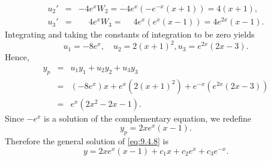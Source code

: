 \begin{examplesolution}
\begin{eqnarray*}
  u_{2}' & = & -4e^{x}W_{2}=-4e^{x}\left(-e^{-x}(x+1)\right)=4(x+1), \\
  u_{3}' & = & \phantom{-}4e^{x}W_{3}=\phantom{-}4e^{x}\left(e^{x}(x-1)\right)=4e^{2x}(x-1).
\end{eqnarray*}
Integrating and taking the constants of integration to be zero yields
\[
  u_{1}=-8e^{x},\quad u_{2}=2(x+1)^{2},u_{3}=e^{2x}(2x-3).
\]
Hence,
\begin{eqnarray*}
  y_{p} & = & u_{1}y_{1}+u_{2}y_{2}+u_{3}y_{3}                             \\
        & = & (-8e^{x})x+e^{x}(2(x+1)^{2})+e^{-x}\left(e^{2x}(2x-3)\right) \\
        & = & e^{x}(2x^{2}-2x-1).
\end{eqnarray*}
Since $-e^{x}$ is a solution of the complementary equation, we redefine
\[
  y_{p}=2xe^{x}(x-1).
\]
Therefore the general solution of \eqref{eq:9.4.8} is
\[
  y=2xe^{x}(x-1)+c_{1}x+c_{2}e^{x}+c_{3}e^{-x}.
\]
\end{examplesolution}

